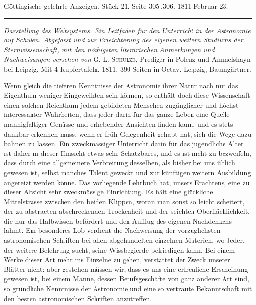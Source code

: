 \clearpage
{}
\begin{center}\small Göttingische gelehrte Anzeigen. Stück 21. Seite 305..306. 1811 Februar 23.\\[3pt]\rule{.72\linewidth}{.3pt}\end{center}

\emph{Darstellung des Weltsystems. Ein Leitfaden für den Unterricht in der Astronomie auf Schulen. Abgefasst und zur Erleichterung des eigenen weitern Studiums der Sternwissenschaft, mit den nöthigsten literärischen Anmerkungen und Nachweisungen versehen von} G. L. \textsc{Schulze}, Prediger in Polenz und Ammelshayn bei Leipzig. Mit 4 Kupfertafeln. 1811. 390 Seiten in Octav. Leipzig, Baumgärtner.

Wenn gleich die tieferen Kenntnisse der Astronomie ihrer Natur nach nur das Eigenthum weniger Eingeweihten sein können, so enthält doch diese Wissenschaft einen solchen Reichthum jedem gebildeten Menschen zugänglicher und höchst interessanter Wahrheiten, dass jeder darin für das ganze Leben eine Quelle mannigfaltiger Genüsse und erhebender Ansichten finden kann, und es stets dankbar erkennen muss, wenn er früh Gelegenheit gehabt hat, sich die Wege dazu bahnen zu lassen. Ein zweckmässiger Unterricht darin für das jugendliche Alter ist daher in dieser Hinsicht etwas sehr Schätzbares, und es ist nicht zu bezweifeln, dass durch eine allgemeinere Verbreitung desselben, als bisher bei uns üblich gewesen ist, selbst manches Talent geweckt und zur künftigen weitern Ausbildung angereizt werden könne. Das vorliegende Lehrbuch hat, unsers Erachtens, eine zu dieser Absicht sehr zweckmässige Einrichtung. Es hält eine glückliche Mittelstrasse zwischen den beiden Klippen, woran man sonst so leicht scheitert, der zu abstracten abschreckenden Trockenheit und der seichten Oberflächlichkeit, die nur das Halbwissen befördert und den Aufflug des eigenen Nachdenkens lähmt. Ein besonderes Lob verdient die Nachweisung der vorzüglichsten astronomischen Schriften bei allen abgehandelten einzelnen Materien, wo Jeder, der weitere Belehrung sucht, seine Wissbegierde befriedigen kann. Bei einem Werke dieser Art mehr ins Einzelne zu gehen, verstattet der Zweck unserer Blätter nicht: aber gestehen müssen wir, dass es uns eine erfreuliche Erscheinung gewesen ist, bei einem Manne, dessen Berufsgeschäfte von ganz anderer Art sind, so gründliche Kenntnisse der Astronomie und eine so vertraute Bekanntschaft mit den besten astronomischen Schriften anzutreffen.

